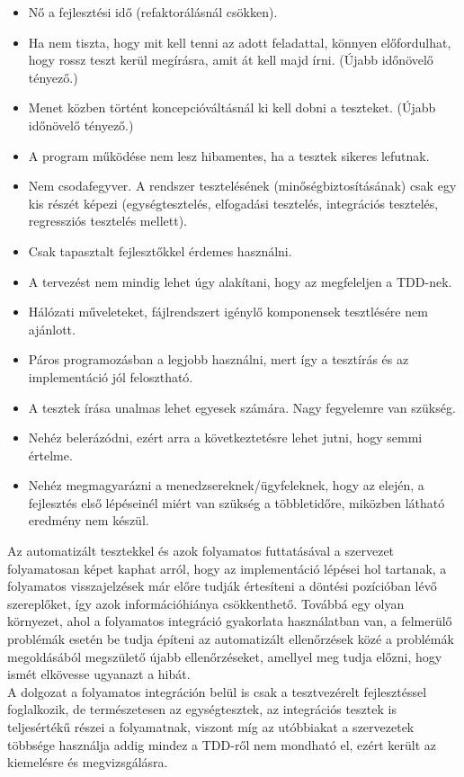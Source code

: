 \begin{itemize}
\item Nő a fejlesztési idő (refaktorálásnál csökken).
\item Ha nem tiszta, hogy mit kell tenni az adott feladattal, könnyen előfordulhat, hogy rossz teszt kerül megírásra, amit át kell majd írni. (Újabb időnövelő tényező.)
\item Menet közben történt koncepcióváltásnál ki kell dobni a teszteket. (Újabb időnövelő tényező.)
\item A program működése nem lesz hibamentes, ha a tesztek sikeres lefutnak.
\item Nem csodafegyver. A rendszer tesztelésének (minőségbiztosításának) csak egy kis részét képezi (egységtesztelés, elfogadási tesztelés, integrációs tesztelés, regressziós tesztelés mellett).
\item Csak tapasztalt fejlesztőkkel érdemes használni.
\item A tervezést nem mindig lehet úgy alakítani, hogy az megfeleljen a TDD-nek.
\item Hálózati műveleteket, fájlrendszert igénylő komponensek tesztlésére nem ajánlott.
\item Páros programozásban a legjobb használni, mert így a tesztírás és az implementáció jól felosztható.
\item A tesztek írása unalmas lehet egyesek számára. Nagy fegyelemre van szükség.
\item Nehéz belerázódni, ezért arra a következtetésre lehet jutni, hogy semmi értelme.
\item Nehéz megmagyarázni a menedzsereknek/ügyfeleknek, hogy az elején, a fejlesztés első lépéseinél miért van szükség a többletidőre, miközben látható eredmény nem készül.
\end{itemize}

Az automatizált tesztekkel és azok folyamatos futtatásával a szervezet folyamatosan képet kaphat arról, hogy az implementáció lépései hol tartanak, a folyamatos visszajelzések már előre tudják értesíteni a döntési pozícióban lévő szereplőket, így azok információhiánya csökkenthető. Továbbá egy olyan környezet, ahol a folyamatos integráció gyakorlata használatban van, a felmerülő problémák esetén be tudja építeni az automatizált ellenőrzések közé a problémák megoldásából megszülető újabb ellenőrzéseket, amellyel meg tudja előzni, hogy ismét elkövesse ugyanazt a hibát.
\\
A dolgozat a folyamatos integráción belül is csak a tesztvezérelt fejlesztéssel foglalkozik, de természetesen az egységtesztek, az integrációs tesztek is teljesértékű részei a folyamatnak, viszont míg az utóbbiakat a szervezetek többsége használja addig mindez a TDD-ről nem mondható el, ezért került az kiemelésre és megvizsgálásra.